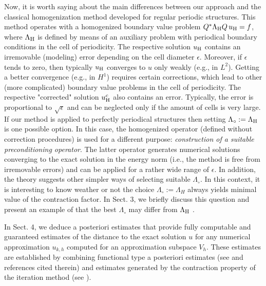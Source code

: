 \documentclass[amstex,amstext,amsfonts,epsf,12pt] {amsart}
\begin{document}
Now, it is worth saying  about the main differences between our approach and the classical homogenization method developed for regular periodic structures. This method operates with a homogenized boundary value problem 
$Q^*\Lambda_{\rm H} Q \,u_{\rm H}=f$, where $\Lambda_{\rm H}$ is defined by means of
an auxiliary problem
with periodical boundary conditions in the cell of periodicity.   The respective solution $u_{\rm H}$
contains an irremovable (modeling) error depending on the cell diameter $\epsilon$.
Moreover, if $\epsilon$ tends to zero, then typically $u_{\rm H}$ converges to $u$ only 
weakly (e.g., in $L^2$). Getting a better convergence (e.g., in $H^1$) requires certain
corrections, which lead to other (more complicated) boundary value problems in the cell of periodicity.
The respective "corrected" solution $u^c_{\rm H}$ also contains an error. 
Typically, the error
is  proportional to $\sqrt{\epsilon}$ and can be neglected only if the amount of cells is very large.
If our method is applied to perfectly periodical structures then setting
$\Lambda_\circ:=\Lambda_{\rm H}$ is one possible option. In this case, the homogenized operator
(defined  without correction procedures) is used for a different purpose: 
{\em construction of a suitable preconditioning operator}. The latter operator generates
numerical solutions converging to the exact solution in the energy norm 
(i.e., the method is free from irremovable errors)  and can be applied for a rather wide
range of  $\epsilon$. In addition, the theory suggests other simpler ways of 
selecting suitable $\Lambda_\circ$. In this context, it is interesting to know weather or not  
the choice $\Lambda_\circ:=\Lambda_H$ always yields  minimal value of the contraction factor.
In Sect. 3, we briefly discuss this question and  present an example of that the best
$\Lambda_\circ$ 
may differ from $\Lambda_{\rm H}$ .

In Sect. 4, we deduce a posteriori estimates that
provide fully computable and guaranteed estimates of the distance to the
exact solution $u$ for any numerical approximation $u_{k,h}$ computed
for an approximation subspace $V_h$. These estimates are established by
combining functional type a posteriori estimates (see \cite{Re2000,NeRe,ReGruyter} and 
references cited therein)  and estimates generated
by the contraction property of the iteration method (see \cite{Ostrowski,Zeidler}).
\end{document}
